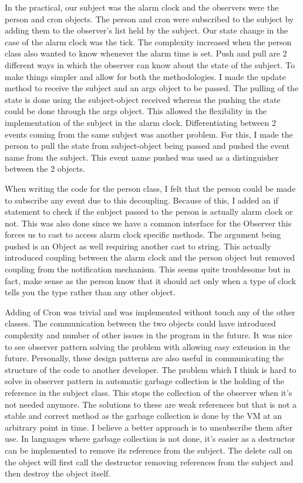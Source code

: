 \documentclass[12pt]{article}
\begin{document}
In the practical, our subject was the alarm clock and the observers were the person and cron objects. The person and cron were subscribed to the subject by adding them to the observer's list held by the subject. Our state change in the case of the alarm clock was the tick. The complexity increased when the person class also wanted to know whenever the alarm time is set. Push and pull are 2 different ways in which the observer can know about the state of the subject. To make things simpler and allow for both the methodologies. I made the update method to receive the subject and an args object to be passed. The pulling of the state is done using the subject-object received whereas the pushing the state could be done through the args object. This allowed the flexibility in the implementation of the subject in the alarm clock. Differentiating between 2 events coming from the same subject was another problem. For this, I made the person to pull the state from subject-object being passed and pushed the event name from the subject. This event name pushed was used as a distinguisher between the 2 objects. 

When writing the code for the person class, I felt that the person could be made to subscribe any event due to this decoupling. Because of this, I added an if statement to check if the subject passed to the person is actually alarm clock or not. This was also done since we have a common interface for the Observer this forces us to cast to access alarm clock specific methods. The argument being pushed is an Object as well requiring another cast to string. This actually introduced coupling between the alarm clock and the person object but removed coupling from the notification mechanism. This seems quite troublesome but in fact, make sense as the person know that it should act only when a type of clock tells you the type rather than any other object. 

Adding of Cron was trivial and was implemented without touch any of the other classes. The communication between the two objects could have introduced complexity and number of other issues in the program in the future. It was nice to see observer pattern solving the problem with allowing easy extension in the future. Personally, these design patterns are also useful in communicating the structure of the code to another developer. The problem which I think is hard to solve in observer pattern in automatic garbage collection is the holding of the reference in the subject class. This stops the collection of the observer when it's not needed anymore. The solutions to these are weak references but that is not a stable and correct method as the garbage collection is done by the VM at an arbitrary point in time. I believe a better approach is to unsubscribe them after use. In languages where garbage collection is not done, it's easier as a destructor can be implemented to remove its reference from the subject. The delete call on the object will first call the destructor removing references from the subject and then destroy the object itself.
\end{document}
